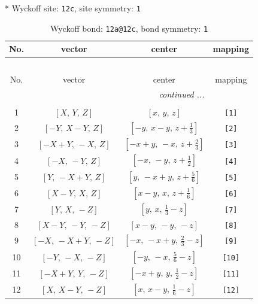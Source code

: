 \documentclass[fleqn,8pt]{jsarticle}
\begin{document}
* Wyckoff site: {\tt 12c}, site symmetry: {\tt 1}
\renewcommand{\arraystretch}{1.2}
\begin{longtable}{cccc}
\caption{Wyckoff bond: {\tt 12a@12c}, bond symmetry: {\tt 1}}
 \\
 \hline \hline
No. & vector & center & mapping \\ \hline \endfirsthead

\multicolumn{3}{l}{\tablename\ \thetable{}} \\
 \hline \hline
No. & vector & center & mapping \\ \hline \endhead

 \hline \hline
\multicolumn{3}{r}{\footnotesize\it continued ...} \\ \endfoot

 \hline \hline
\multicolumn{3}{r}{} \\ \endlastfoot

1 & $\left[ X,\, Y,\, Z \right]$ & $\left[ x,\, y,\, z \right]$ & {\tt [1]} \\ \hline
2 & $\left[ - Y,\, X - Y,\, Z \right]$ & $\left[ - y,\, x - y,\, z + \frac{1}{3} \right]$ & {\tt [2]} \\ \hline
3 & $\left[ - X + Y,\, - X,\, Z \right]$ & $\left[ - x + y,\, - x,\, z + \frac{2}{3} \right]$ & {\tt [3]} \\ \hline
4 & $\left[ - X,\, - Y,\, Z \right]$ & $\left[ - x,\, - y,\, z + \frac{1}{2} \right]$ & {\tt [4]} \\ \hline
5 & $\left[ Y,\, - X + Y,\, Z \right]$ & $\left[ y,\, - x + y,\, z + \frac{5}{6} \right]$ & {\tt [5]} \\ \hline
6 & $\left[ X - Y,\, X,\, Z \right]$ & $\left[ x - y,\, x,\, z + \frac{1}{6} \right]$ & {\tt [6]} \\ \hline
7 & $\left[ Y,\, X,\, - Z \right]$ & $\left[ y,\, x,\, \frac{1}{3} - z \right]$ & {\tt [7]} \\ \hline
8 & $\left[ X - Y,\, - Y,\, - Z \right]$ & $\left[ x - y,\, - y,\, - z \right]$ & {\tt [8]} \\ \hline
9 & $\left[ - X,\, - X + Y,\, - Z \right]$ & $\left[ - x,\, - x + y,\, \frac{2}{3} - z \right]$ & {\tt [9]} \\ \hline
10 & $\left[ - Y,\, - X,\, - Z \right]$ & $\left[ - y,\, - x,\, \frac{5}{6} - z \right]$ & {\tt [10]} \\ \hline
11 & $\left[ - X + Y,\, Y,\, - Z \right]$ & $\left[ - x + y,\, y,\, \frac{1}{2} - z \right]$ & {\tt [11]} \\ \hline
12 & $\left[ X,\, X - Y,\, - Z \right]$ & $\left[ x,\, x - y,\, \frac{1}{6} - z \right]$ & {\tt [12]} \\
\end{longtable}
\end{document}

